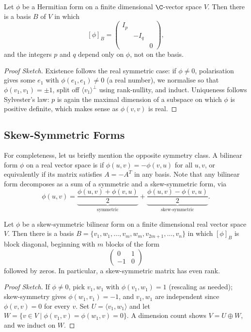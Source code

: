 \begin{theorem}
    Let $\phi$ be a Hermitian form on a finite dimensional $\C$-vector space $V$. Then there is a basis $B$ of $V$ in which
    $$
    [\phi]_B = \begin{pmatrix}
        I_p & & \\
        & -I_q & \\
        & & 0
    \end{pmatrix},
    $$
    and the integers $p$ and $q$ depend only on $\phi$, not on the basis.
\end{theorem}
\begin{proof}[Proof Sketch]
    Existence follows the real symmetric case: if $\phi \neq 0$, polarisation gives some $e_1$ with $\phi(e_1, e_1) \neq 0$ (a real number), we normalise so that $\phi(v_1, v_1) = \pm 1$, split off $\langle v_1 \rangle^\perp$ using rank-nullity, and induct. Uniqueness follows Sylvester's law: $p$ is again the maximal dimension of a subspace on which $\phi$ is positive definite, which makes sense as $\phi(v,v)$ is real.
\end{proof}

\subsection{Skew-Symmetric Forms}

For completeness, let us briefly mention the opposite symmetry class. A bilinear form $\phi$ on a real vector space is  if $\phi(u, v) = -\phi(v, u)$ for all $u, v$, or equivalently if its matrix satisfies $A = -A^T$ in any basis. Note that any bilinear form decomposes as a sum of a symmetric and a skew-symmetric form, via
$$
\phi(u,v) = \underbrace{\frac{\phi(u,v) + \phi(v,u)}{2}}_{\text{symmetric}} + \underbrace{\frac{\phi(u,v) - \phi(v,u)}{2}}_{\text{skew-symmetric}}.
$$

\begin{theorem}
    Let $\phi$ be a skew-symmetric bilinear form on a finite dimensional real vector space $V$. Then there is a basis $B = \{v_1, w_1, \dots, v_m, w_m, v_{2m + 1}, \dots, v_n\}$ in which $[\phi]_B$ is block diagonal, beginning with $m$ blocks of the form
    $$
    \begin{pmatrix}
        0 & 1 \\ -1 & 0
    \end{pmatrix}
    $$
    followed by zeros. In particular, a skew-symmetric matrix has even rank.
\end{theorem}
\begin{proof}[Proof Sketch]
    If $\phi \neq 0$, pick $v_1, w_1$ with $\phi(v_1, w_1) = 1$ (rescaling as needed); skew-symmetry gives $\phi(w_1, v_1) = -1$, and $v_1, w_1$ are independent since $\phi(v, v) = 0$ for every $v$. Set $U = \langle v_1, w_1 \rangle$ and let $W = \{v \in V \mid \phi(v_1, v) = \phi(w_1, v) = 0\}$. A dimension count shows $V = U \oplus W$, and we induct on $W$.
\end{proof}

